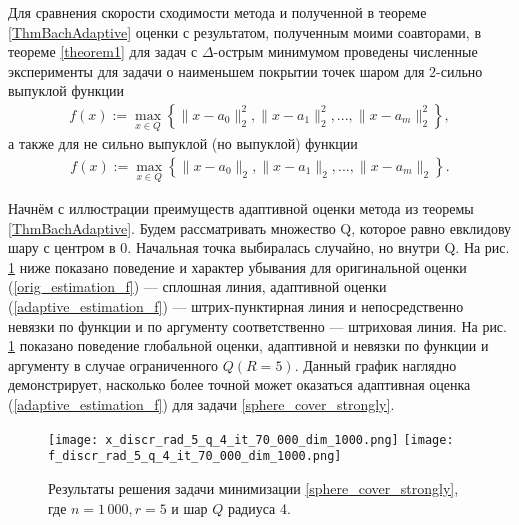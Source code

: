     Для сравнения скорости сходимости метода \cite{Bach_2012} и полученной в теореме \ref{ThmBachAdaptive} оценки с результатом, полученным моими соавторами, в теореме \ref{theorem1} для задач с $\Delta$-острым минимумом проведены численные эксперименты для задачи о наименьшем покрытии точек шаром для $2$-сильно выпуклой функции
    \begin{gather}\label{sphere_cover_strongly}
        f(x) := \max_{x\in Q}\left\{\|x - a_0\|_2^2, \|x - a_1\|_2^2, ..., \|x - a_m\|_2^2\right\},
    \end{gather}
    а также для не сильно выпуклой (но выпуклой) функции
    \begin{gather}\label{sphere_cover}
        f(x) := \max_{x\in Q}\left\{\|x - a_0\|_2, \|x - a_1\|_2, ..., \|x - a_m\|_2\right\}.
    \end{gather}

    Начнём с иллюстрации преимуществ адаптивной оценки метода \cite{Bach_2012} из теоремы \ref{ThmBachAdaptive}. Будем рассматривать множество Q, которое равно евклидову шару с центром в 0. Начальная точка выбиралась случайно, но внутри Q. На рис. \ref{res_ex_strong_r5} ниже показано поведение и характер убывания для оригинальной оценки (\ref{orig_estimation_f}) --- сплошная линия, адаптивной оценки (\ref{adaptive_estimation_f}) --- штрих-пунктирная линия и непосредственно невязки по функции и по аргументу соответственно --- штриховая линия. На рис. \ref{res_ex_strong_r5} показано поведение глобальной оценки, адаптивной и невязки по функции и аргументу в случае ограниченного $Q (R = 5)$. Данный график наглядно демонстрирует, насколько более точной может оказаться адаптивная оценка (\ref{adaptive_estimation_f}) для задачи \eqref{sphere_cover_strongly}. 

    \begin{figure}[h]
        \texttt{[image: x\_discr\_rad\_5\_q\_4\_it\_70\_000\_dim\_1000.png]}
        \endminipage\hfill
        \texttt{[image: f\_discr\_rad\_5\_q\_4\_it\_70\_000\_dim\_1000.png]}
        \endminipage\hfill
        \caption{Результаты решения задачи минимизации \eqref{sphere_cover_strongly}, где  $n= 1\,000, r = 5$ и  шар $Q$ радиуса 4.}
        \label{res_ex_strong_r5}
    \end{figure}

